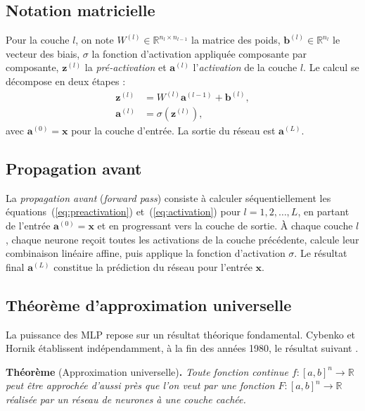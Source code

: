 \documentclass[a4paper,french]{style-LaTeX}
\begin{document}
\subsection*{Notation matricielle}

Pour la couche $l$, on note $W^{(l)} \in \mathbb{R}^{n_l \times n_{l-1}}$ la matrice des poids, $\mathbf{b}^{(l)} \in \mathbb{R}^{n_l}$ le vecteur des biais, $\sigma$ la fonction d'activation appliquée composante par composante, $\mathbf{z}^{(l)}$ la \emph{pré-activation} et $\mathbf{a}^{(l)}$ l'\emph{activation} de la couche $l$. Le calcul se décompose en deux étapes :
\begin{align}
  \mathbf{z}^{(l)} &= W^{(l)} \mathbf{a}^{(l-1)} + \mathbf{b}^{(l)}, \label{eq:preactivation} \\
  \mathbf{a}^{(l)} &= \sigma\!\left(\mathbf{z}^{(l)}\right), \label{eq:activation}
\end{align}
avec $\mathbf{a}^{(0)} = \mathbf{x}$ pour la couche d'entrée. La sortie du réseau est $\mathbf{a}^{(L)}$.

\subsection*{Propagation avant}

La \emph{propagation avant} (\emph{forward pass}) consiste à calculer séquentiellement les équations~(\ref{eq:preactivation}) et~(\ref{eq:activation}) pour $l = 1, 2, \ldots, L$, en partant de l'entrée $\mathbf{a}^{(0)} = \mathbf{x}$ et en progressant vers la couche de sortie. À chaque couche $l$, chaque neurone reçoit toutes les activations de la couche précédente, calcule leur combinaison linéaire affine, puis applique la fonction d'activation $\sigma$. Le résultat final $\mathbf{a}^{(L)}$ constitue la prédiction du réseau pour l'entrée $\mathbf{x}$.

\subsection*{Théorème d'approximation universelle}

La puissance des MLP repose sur un résultat théorique fondamental. Cybenko \cite{Cybenko89} et Hornik \cite{Hornik91} établissent indépendamment, à la fin des années 1980, le résultat suivant \cite{Exo7deepmath}.

\textbf{Théorème} (Approximation universelle)\textbf{.} \textit{Toute fonction continue $f : [a,b]^n \to \mathbb{R}$ peut être approchée d'aussi près que l'on veut par une fonction $F : [a,b]^n \to \mathbb{R}$ réalisée par un réseau de neurones à une couche cachée.}
\end{document}
